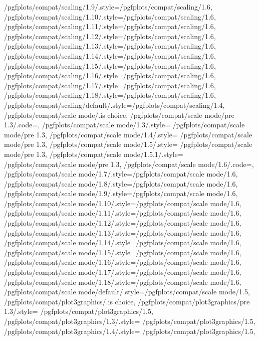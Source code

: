 {	/pgfplots/compat/scaling/1.9/.style={/pgfplots/compat/scaling/1.6},
	/pgfplots/compat/scaling/1.10/.style={/pgfplots/compat/scaling/1.6},
	/pgfplots/compat/scaling/1.11/.style={/pgfplots/compat/scaling/1.6},
	/pgfplots/compat/scaling/1.12/.style={/pgfplots/compat/scaling/1.6},
	/pgfplots/compat/scaling/1.13/.style={/pgfplots/compat/scaling/1.6},
	/pgfplots/compat/scaling/1.14/.style={/pgfplots/compat/scaling/1.6},
	/pgfplots/compat/scaling/1.15/.style={/pgfplots/compat/scaling/1.6},
	/pgfplots/compat/scaling/1.16/.style={/pgfplots/compat/scaling/1.6},
	/pgfplots/compat/scaling/1.17/.style={/pgfplots/compat/scaling/1.6},
	/pgfplots/compat/scaling/1.18/.style={/pgfplots/compat/scaling/1.6},
	/pgfplots/compat/scaling/default/.style={/pgfplots/compat/scaling/1.4},
	/pgfplots/compat/scale mode/.is choice,
	/pgfplots/compat/scale mode/pre 1.3/.code=\def\pgfplots@compat@scale@mode@compatible@mode{1},%
	/pgfplots/compat/scale mode/1.3/.style=		{/pgfplots/compat/scale mode/pre 1.3},
	/pgfplots/compat/scale mode/1.4/.style=		{/pgfplots/compat/scale mode/pre 1.3},
	/pgfplots/compat/scale mode/1.5/.style=	 	{/pgfplots/compat/scale mode/pre 1.3},
	/pgfplots/compat/scale mode/1.5.1/.style=	{/pgfplots/compat/scale mode/pre 1.3},
	/pgfplots/compat/scale mode/1.6/.code=\def\pgfplots@compat@scale@mode@compatible@mode{0},
	/pgfplots/compat/scale mode/1.7/.style={/pgfplots/compat/scale mode/1.6},
	/pgfplots/compat/scale mode/1.8/.style={/pgfplots/compat/scale mode/1.6},
	/pgfplots/compat/scale mode/1.9/.style={/pgfplots/compat/scale mode/1.6},
	/pgfplots/compat/scale mode/1.10/.style={/pgfplots/compat/scale mode/1.6},
	/pgfplots/compat/scale mode/1.11/.style={/pgfplots/compat/scale mode/1.6},
	/pgfplots/compat/scale mode/1.12/.style={/pgfplots/compat/scale mode/1.6},
	/pgfplots/compat/scale mode/1.13/.style={/pgfplots/compat/scale mode/1.6},
	/pgfplots/compat/scale mode/1.14/.style={/pgfplots/compat/scale mode/1.6},
	/pgfplots/compat/scale mode/1.15/.style={/pgfplots/compat/scale mode/1.6},
	/pgfplots/compat/scale mode/1.16/.style={/pgfplots/compat/scale mode/1.6},
	/pgfplots/compat/scale mode/1.17/.style={/pgfplots/compat/scale mode/1.6},
	/pgfplots/compat/scale mode/1.18/.style={/pgfplots/compat/scale mode/1.6},
	/pgfplots/compat/scale mode/default/.style={/pgfplots/compat/scale mode/1.5},
	/pgfplots/compat/plot3graphics/.is choice,
	/pgfplots/compat/plot3graphics/pre 1.3/.style=	{/pgfplots/compat/plot3graphics/1.5},
	/pgfplots/compat/plot3graphics/1.3/.style=		{/pgfplots/compat/plot3graphics/1.5},
	/pgfplots/compat/plot3graphics/1.4/.style=		{/pgfplots/compat/plot3graphics/1.5},%
}
